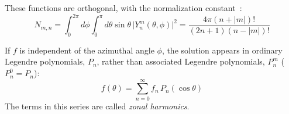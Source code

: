 These functions are orthogonal, with the normalization constant~\cite[App.~A]{stakgold}:
\begin{equation}
N_{m,n}=\int_0^{2\pi}\!\!d\phi\int_0^{\pi}\!\!d\theta \sin\theta\, \big|Y^m_n(\theta,\phi)\big|^2 = \frac{4\pi (n+|m|)!}{(2n+1)(n-|m|)!}
\end{equation} 

If $f$ is independent of the azimuthal angle $\phi$, the solution appears in ordinary Legendre polynomials, $P_n$, rather than associated Legendre polynomials, $P^m_n$ ($P^0_n = P_n$):
\begin{equation}
f(\theta) = \sum_{n=0}^\infty f_n\, P_n(\cos\theta)
\end{equation}
The terms in this series are called \textit{zonal harmonics}.


 



